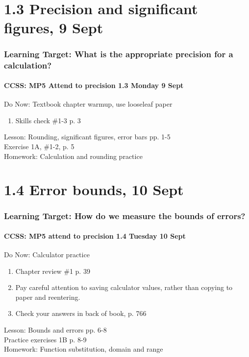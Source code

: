\documentclass{beamer}
\begin{document}
  \section{1.3 Precision and significant figures, 9 Sept}
  \frame
  {
    \frametitle{Learning Target: What is the appropriate precision for a calculation?}
    \framesubtitle{CCSS: MP5 Attend to precision \hfill \alert{1.3 Monday 9 Sept}}

    \begin{block}{Do Now: Textbook chapter warmup, use looseleaf paper}
    \begin{enumerate}
        \item Skills check \#1-3 p. 3
    \end{enumerate}
    \end{block}
    Lesson: Rounding, significant figures, error bars pp. 1-5\\
    Exercise 1A, \#1-2, p. 5
    \\[0.5cm]
    Homework: Calculation and rounding practice
  }

  \section{1.4 Error bounds, 10 Sept}
  \frame
  {
    \frametitle{Learning Target: How do we measure the bounds of errors?}
    \framesubtitle{CCSS: MP5 attend to precision \hfill \alert{1.4 Tuesday 10 Sept}}

    \begin{block}{Do Now: Calculator practice}
    \begin{enumerate}
        \item Chapter review \#1 p. 39
        \item Pay careful attention to saving calculator values, rather than copying to paper and reentering.
        \item Check your answers in back of book, p. 766
    \end{enumerate}
    \end{block}
    Lesson: Bounds and errors pp. 6-8\\ \bigskip
    Practice exercises 1B p. 8-9\\
    Homework: Function substitution, domain and range
  }
\end{document}
